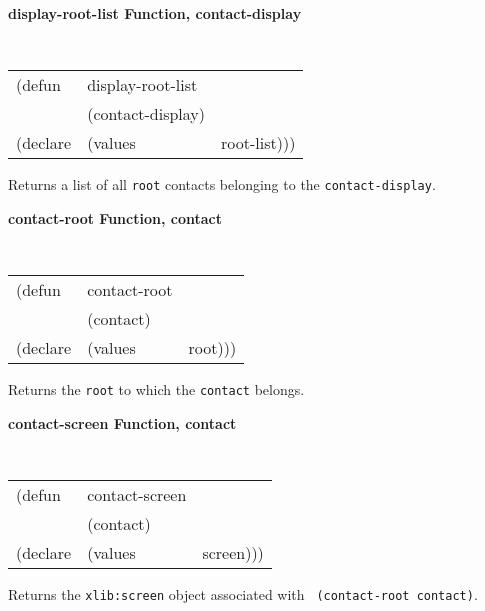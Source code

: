\documentclass[twoside]{book}
\begin{document}
\begin{sloppy}
\begin{flushright}
{}\end{flushright}

{\samepage
{\large {\bf display-root-list \hfill Function, contact-display}}
\begin{flushright} \parbox[t]{6.125in}{
\tt
\begin{tabular}{lll}
\raggedright
(defun & display-root-list & \\ 
& (contact-display) \\
(declare &(values  & root-list)))
\end{tabular}
\rm

}\end{flushright}
}

\begin{flushright} \parbox[t]{6.125in}{
Returns a list of all {\tt root} contacts belonging to the {\tt contact-display}.
}\end{flushright}


{\samepage
{\large {\bf contact-root \hfill Function, contact}}
\begin{flushright} \parbox[t]{6.125in}{
\tt
\begin{tabular}{lll}
\raggedright
(defun & contact-root & \\ 
& (contact) \\
(declare &(values  & root)))
\end{tabular}
\rm

Returns the {\tt root} to which the {\tt contact} belongs. 
}\end{flushright}}

{\samepage
{\large {\bf contact-screen \hfill Function, contact}}
\begin{flushright} \parbox[t]{6.125in}{
\tt
\begin{tabular}{lll}
\raggedright
(defun & contact-screen & \\ 
& (contact) \\
(declare &(values  & screen)))
\end{tabular}
\rm

Returns the {\tt xlib:screen} object associated with {\tt
(contact-root contact)}. 
}\end{flushright}}




\end{sloppy}
\end{document}
